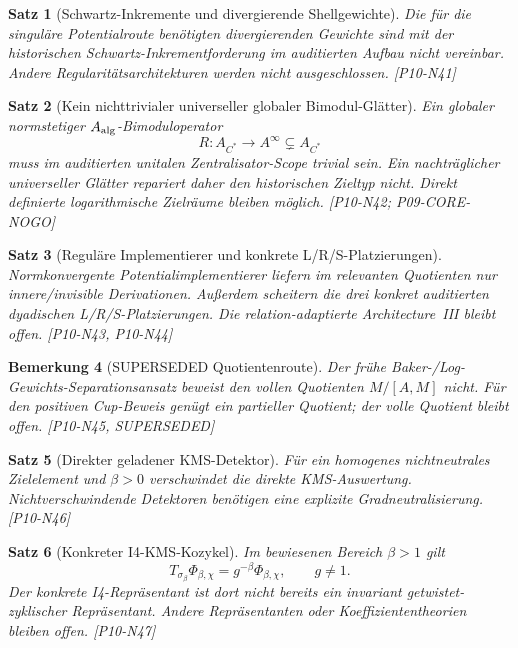 \documentclass[11pt,a4paper]{amsart}
\newtheorem{theorem}{Satz}[section]
\newtheorem{remark}[theorem]{Bemerkung}
\begin{document}
\begin{theorem}[Schwartz-Inkremente und divergierende Shellgewichte]
\label{thm:n41}
Die für die singuläre Potentialroute benötigten divergierenden Gewichte sind
mit der historischen Schwartz-Inkrementforderung im auditierten Aufbau nicht
vereinbar. Andere Regularitätsarchitekturen werden nicht ausgeschlossen.
\emph{[P10-N41]}
\end{theorem}

\begin{theorem}[Kein nichttrivialer universeller globaler Bimodul-Glätter]
\label{thm:n42}
Ein globaler normstetiger $A_{\rm alg}$-Bimoduloperator
\[
  R:A_{C^*}\to A^\infty\subsetneq A_{C^*}
\]
muss im auditierten unitalen Zentralisator-Scope trivial sein. Ein
nachträglicher universeller Glätter repariert daher den historischen Zieltyp
nicht. Direkt definierte logarithmische Zielräume bleiben möglich.
\emph{[P10-N42; P09-CORE-NOGO]}
\end{theorem}

\begin{theorem}[Reguläre Implementierer und konkrete L/R/S-Platzierungen]
\label{thm:n43n44}
Normkonvergente Potentialimplementierer liefern im relevanten Quotienten nur
innere/invisible Derivationen. Außerdem scheitern die drei konkret auditierten
dyadischen L/R/S-Platzierungen. Die relation-adaptierte Architecture~III bleibt
offen. \emph{[P10-N43, P10-N44]}
\end{theorem}

\begin{remark}[SUPERSEDED Quotientenroute]\label{rem:n45}
Der frühe Baker-/Log-Gewichts-Separationsansatz beweist den vollen Quotienten
$M/[A,M]$ nicht. Für den positiven Cup-Beweis genügt ein partieller Quotient;
der volle Quotient bleibt offen. \emph{[P10-N45, SUPERSEDED]}
\end{remark}

\begin{theorem}[Direkter geladener KMS-Detektor]\label{thm:n46}
Für ein homogenes nichtneutrales Zielelement und $\beta>0$ verschwindet die
direkte KMS-Auswertung. Nichtverschwindende Detektoren benötigen eine explizite
Gradneutralisierung. \emph{[P10-N46]}
\end{theorem}

\begin{theorem}[Konkreter I4-KMS-Kozykel]\label{thm:n47}
Im bewiesenen Bereich $\beta>1$ gilt
\[
  T_{\sigma_\beta}\Phi_{\beta,\chi}
  =g^{-\beta}\Phi_{\beta,\chi},
  \qquad g\ne1.
\]
Der konkrete I4-Repräsentant ist dort nicht bereits ein invariant
getwistet-zyklischer Repräsentant. Andere Repräsentanten oder
Koeffiziententheorien bleiben offen. \emph{[P10-N47]}
\end{theorem}
\end{document}
